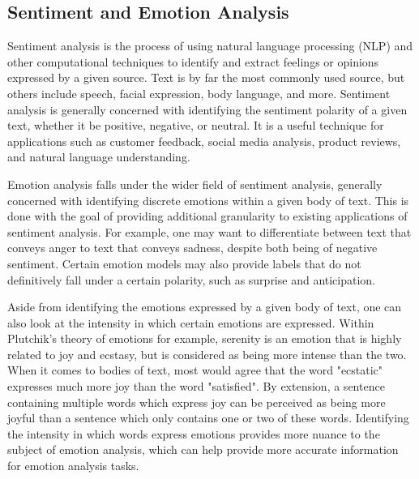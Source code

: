 \documentclass[journal]{./IEEE/IEEEtran}
\begin{document}
\subsection{Sentiment and Emotion Analysis}
Sentiment analysis is the process of using natural language processing (NLP) and other computational techniques to identify and extract feelings or opinions expressed by a given source\cite{Wankhade1}. Text is by far the most commonly used source, but others include speech, facial expression, body language, and more. Sentiment analysis is generally concerned with identifying the sentiment polarity of a given text, whether it be positive, negative, or neutral. It is a useful technique for applications such as customer feedback, social media analysis, product reviews, and natural language understanding.

Emotion analysis falls under the wider field of sentiment analysis, generally concerned with identifying discrete emotions within a given body of text\cite{Yadollahi1}. This is done with the goal of providing additional granularity to existing applications of sentiment analysis. For example, one may want to differentiate between text that conveys anger to text that conveys sadness, despite both being of negative sentiment. Certain emotion models may also provide labels that do not definitively fall under a certain polarity, such as surprise and anticipation.

Aside from identifying the emotions expressed by a given body of text, one can also look at the intensity in which certain emotions are expressed. Within Plutchik's theory of emotions\cite{Plutchik1} for example, serenity is an emotion that is highly related to joy and ecstasy, but is considered as being more intense than the two. When it comes to bodies of text, most would agree that the word "ecstatic" expresses much more joy than the word "satisfied". By extension, a sentence containing multiple words which express joy can be perceived as being more joyful than a sentence which only contains one or two of these words. Identifying the intensity in which words express emotions provides more nuance to the subject of emotion analysis, which can help provide more accurate information for emotion analysis tasks.
\end{document}
